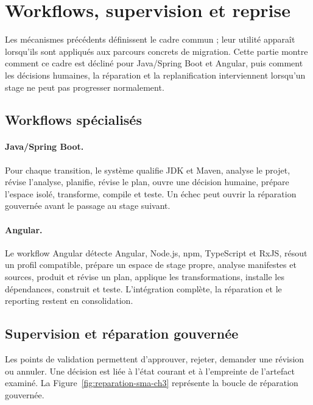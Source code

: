 \section{Workflows, supervision et reprise}

Les mécanismes précédents définissent le cadre commun ; leur utilité apparaît lorsqu'ils sont appliqués aux parcours concrets de migration. Cette partie montre comment ce cadre est décliné pour Java/Spring Boot et Angular, puis comment les décisions humaines, la réparation et la replanification interviennent lorsqu'un stage ne peut pas progresser normalement.

\subsection{Workflows spécialisés}

\paragraph{Java/Spring Boot.}

Pour chaque transition, le système qualifie JDK et Maven, analyse le projet, révise l'analyse, planifie, révise le plan, ouvre une décision humaine, prépare l'espace isolé, transforme, compile et teste. Un échec peut ouvrir la réparation gouvernée avant le passage au stage suivant.

\paragraph{Angular.}

Le workflow Angular détecte Angular, Node.js, npm, TypeScript et RxJS, résout un profil compatible, prépare un espace de stage propre, analyse manifestes et sources, produit et révise un plan, applique les transformations, installe les dépendances, construit et teste. L'intégration complète, la réparation et le reporting restent en consolidation.

\subsection{Supervision et réparation gouvernée}

Les points de validation permettent d'approuver, rejeter, demander une révision ou annuler. Une décision est liée à l'état courant et à l'empreinte de l'artefact examiné. La Figure~\ref{fig:reparation-sma-ch3} représente la boucle de réparation gouvernée.

